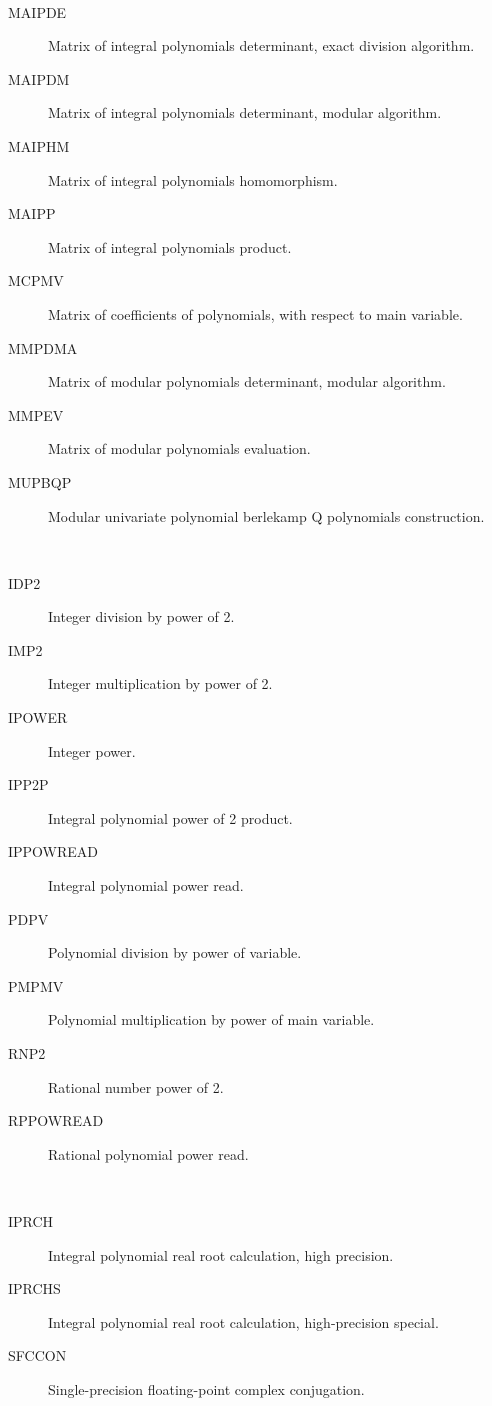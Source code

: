 \begin{description}
\begin{description}
  \end{description}
\item[polynomials] \ \ 
  \begin{description}
  \item[MAIPDE]  Matrix of integral polynomials determinant, exact division
    algorithm.
  \item[MAIPDM]  Matrix of integral polynomials determinant, modular
    algorithm.
  \item[MAIPHM]  Matrix of integral polynomials homomorphism.
  \item[MAIPP]  Matrix of integral polynomials product.
  \item[MCPMV]  Matrix of coefficients of polynomials, with respect to main
    variable.
  \item[MMPDMA]  Matrix of modular polynomials determinant, modular algorithm.
  \item[MMPEV]  Matrix of modular polynomials evaluation.
  \item[MUPBQP]  Modular univariate polynomial berlekamp Q polynomials
    construction.
  \end{description}
\item[power] \ \ 
  \begin{description}
  \item[IDP2]  Integer division by power of 2.
  \item[IMP2]  Integer multiplication by power of 2.
  \item[IPOWER]  Integer power.
  \item[IPP2P]  Integral polynomial power of 2 product.
  \item[IPPOWREAD]  Integral polynomial power read.
  \item[PDPV]  Polynomial division by power of variable.
  \item[PMPMV]  Polynomial multiplication by power of main variable.
  \item[RNP2]  Rational number power of 2.
  \item[RPPOWREAD]  Rational polynomial power read.
  \end{description}
\item[precision] \ \ 
  \begin{description}
  \item[IPRCH]  Integral polynomial real root calculation, high precision.
  \item[IPRCHS]  Integral polynomial real root calculation, high-precision
    special.
  \item[SFCCON]  Single-precision floating-point complex conjugation.

\end{description}
\end{description}
